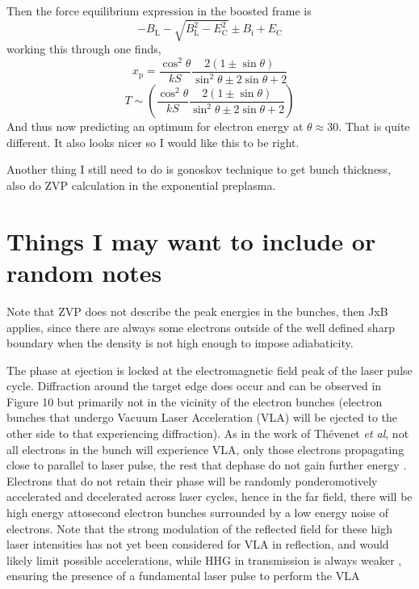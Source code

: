Then the force equilibrium expression in the boosted frame is
\begin{equation}
	-B_\mathrm{L} - \sqrt{B_\mathrm{L}^2 - E_\mathrm{C}^2} \pm B_\mathrm{i} + E_\mathrm{C}
\end{equation}
working this through one finds,
\begin{equation}
	x_\mathrm{p} = \frac{\cos^2\theta}{kS}\frac{2(1\pm \sin\theta)}{\sin^2\theta \pm 2\sin\theta +2}
\end{equation}
\begin{equation}
	T \sim \left(\frac{\cos^2\theta}{kS}\frac{2(1\pm \sin\theta)}{\sin^2\theta \pm 2\sin\theta +2}\right)
\end{equation}
And thus now predicting an optimum for electron energy at $\theta \approx 30$\degree. That is quite different. It also looks nicer so I would like this to be right.

Another thing I still need to do is gonoskov technique to get bunch thickness, also do ZVP calculation in the exponential preplasma.


\section{Things I may want to include or random notes}
Note that ZVP does not describe the peak energies in the bunches, then JxB applies, since there are always some electrons outside of the well defined sharp boundary when the density is not high enough to impose adiabaticity. 


The phase at ejection is locked at the electromagnetic field peak of the laser pulse cycle. Diffraction around the target edge does occur and can be observed in Figure 10 but primarily not in the vicinity of the electron bunches (electron bunches that undergo Vacuum Laser Acceleration (VLA) will be ejected to the other side to that experiencing diffraction). As in the work of Thévenet \textit{et al}, not all electrons in the bunch will experience VLA, only those electrons propagating close to parallel to laser pulse, the rest that dephase do not gain further energy \cite{Thevenet2016}. Electrons that do not retain their phase will be randomly ponderomotively accelerated and decelerated across laser cycles, hence in the far field, there will be high energy attosecond electron bunches surrounded by a low energy noise of electrons. Note that the strong modulation of the reflected field for these high laser intensities has not yet been considered for VLA in reflection, and would likely limit possible accelerations, while HHG in transmission is always weaker \cite{cousens2020}, ensuring the presence of a fundamental laser pulse to perform the VLA

